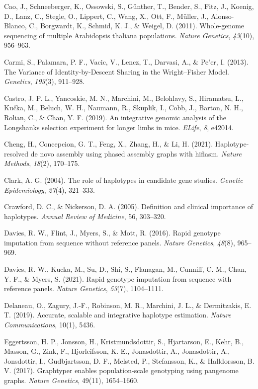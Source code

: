 \documentclass[twocolumn]{bmcart}%
\begin{document}
\begin{backmatter}
\begin{hangparas}{1em}{1}
Cao, J., Schneeberger, K., Ossowski, S., Günther, T., Bender, S., Fitz,
J., Koenig, D., Lanz, C., Stegle, O., Lippert, C., Wang, X., Ott, F.,
Müller, J., Alonso-Blanco, C., Borgwardt, K., Schmid, K. J., \& Weigel,
D. (2011). Whole-genome sequencing of multiple Arabidopsis thaliana
populations. \emph{Nature Genetics}, \emph{43}(10), 956--963.

Carmi, S., Palamara, P. F., Vacic, V., Lencz, T., Darvasi, A., \& Pe'er,
I. (2013). The Variance of Identity-by-Descent Sharing in the
Wright--Fisher Model. \emph{Genetics}, \emph{193}(3), 911--928.

Castro, J. P. L., Yancoskie, M. N., Marchini, M., Belohlavy, S.,
Hiramatsu, L., Kučka, M., Beluch, W. H., Naumann, R., Skuplik, I., Cobb,
J., Barton, N. H., Rolian, C., \& Chan, Y. F. (2019). An integrative
genomic analysis of the Longshanks selection experiment for longer limbs
in mice. \emph{ELife}, \emph{8}, e42014.

Cheng, H., Concepcion, G. T., Feng, X., Zhang, H., \& Li, H. (2021).
Haplotype-resolved de novo assembly using phased assembly graphs with
hifiasm. \emph{Nature Methods}, \emph{18}(2), 170--175.

Clark, A. G. (2004). The role of haplotypes in candidate gene studies.
\emph{Genetic Epidemiology}, \emph{27}(4), 321--333.

Crawford, D. C., \& Nickerson, D. A. (2005). Definition and clinical
importance of haplotypes. \emph{Annual Review of Medicine}, 56,
303--320.

Davies, R. W., Flint, J., Myers, S., \& Mott, R. (2016). Rapid genotype
imputation from sequence without reference panels. \emph{Nature
Genetics}, \emph{48}(8), 965--969.

Davies, R. W., Kucka, M., Su, D., Shi, S., Flanagan, M., Cunniff, C. M.,
Chan, Y. F., \& Myers, S. (2021). Rapid genotype imputation from
sequence with reference panels. \emph{Nature Genetics}, \emph{53}(7),
1104--1111.

Delaneau, O., Zagury, J.-F., Robinson, M. R., Marchini, J. L., \&
Dermitzakis, E. T. (2019). Accurate, scalable and integrative haplotype
estimation. \emph{Nature Communications}, 10(1), 5436.

Eggertsson, H. P., Jonsson, H., Kristmundsdottir, S., Hjartarson, E.,
Kehr, B., Masson, G., Zink, F., Hjorleifsson, K. E., Jonasdottir, A.,
Jonasdottir, A., Jonsdottir, I., Gudbjartsson, D. F., Melsted, P.,
Stefansson, K., \& Halldorsson, B. V. (2017). Graphtyper enables
population-scale genotyping using pangenome graphs. \emph{Nature
Genetics}, 49(11), 1654--1660.


\end{hangparas}
\end{backmatter}
\end{document}
